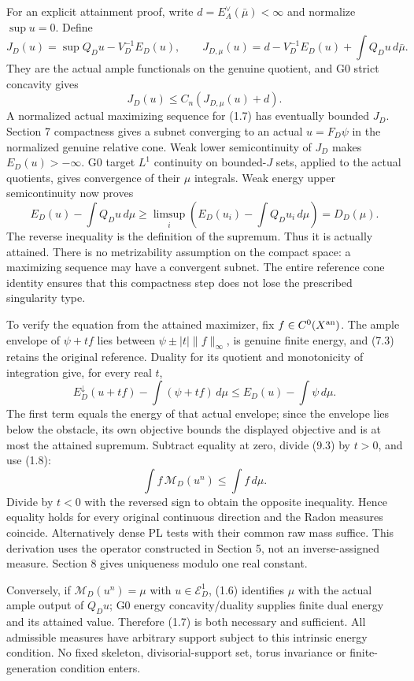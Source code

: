 \documentclass[
  10pt,
]{article}
\begin{document}
For an explicit attainment proof, write \(d=E_A^{\vee}(\bar\mu)<\infty\)
and normalize \(\sup u=0\). Define \[
 J_D(u)=\sup Q_Du-V_D^{-1}E_D(u),\qquad
 J_{D,\mu}(u)=d-V_D^{-1}E_D(u)+\int Q_Du\,d\bar\mu.
\] They are the actual ample functionals on the genuine quotient, and G0
strict concavity gives \[
                   J_D(u)\leq C_n(J_{D,\mu}(u)+d).            \tag{9.2}
\] A normalized actual maximizing sequence for (1.7) has eventually
bounded \(J_D\). Section 7 compactness gives a subnet converging to an
actual \(u=F_D\psi\) in the normalized genuine relative cone. Weak lower
semicontinuity of \(J_D\) makes \(E_D(u)>-\infty\). G0 target \(L^1\)
continuity on bounded-\(J\) sets, applied to the actual quotients, gives
convergence of their \(\mu\) integrals. Weak energy upper semicontinuity
now proves \[
 E_D(u)-\int Q_Du\,d\mu
       \geq\limsup_i\left(E_D(u_i)-\int Q_Du_i\,d\mu\right)=D_D(\mu).
\] The reverse inequality is the definition of the supremum. Thus it is
actually attained. There is no metrizability assumption on the compact
space: a maximizing sequence may have a convergent subnet. The entire
reference cone identity ensures that this compactness step does not lose
the prescribed singularity type.

To verify the equation from the attained maximizer, fix
\(f\in C^0(X^{\rm an})\). The ample envelope of \(\psi+tf\) lies between
\(\psi\pm|t|\|f\|_\infty\), is genuine finite energy, and (7.3) retains
the original reference. Duality for its quotient and monotonicity of
integration give, for every real \(t\), \[
 E_D^\downarrow(u+tf)-\int(\psi+tf)\,d\mu
                   \leq E_D(u)-\int\psi\,d\mu.              \tag{9.3}
\] The first term equals the energy of that actual envelope; since the
envelope lies below the obstacle, its own objective bounds the displayed
objective and is at most the attained supremum. Subtract equality at
zero, divide (9.3) by \(t>0\), and use (1.8):
\[\int f\,\mathcal M_D(u^n)\leq\int f\,d\mu.\] Divide by \(t<0\) with
the reversed sign to obtain the opposite inequality. Hence equality
holds for every original continuous direction and the Radon measures
coincide. Alternatively dense PL tests with their common raw mass
suffice. This derivation uses the operator constructed in Section 5, not
an inverse-assigned measure. Section 8 gives uniqueness modulo one real
constant.

Conversely, if \(\mathcal M_D(u^n)=\mu\) with \(u\in\mathcal E_D^1\),
(1.6) identifies \(\mu\) with the actual ample output of \(Q_Du\); G0
energy concavity/duality supplies finite dual energy and its attained
value. Therefore (1.7) is both necessary and sufficient. All admissible
measures have arbitrary support subject to this intrinsic energy
condition. No fixed skeleton, divisorial-support set, torus invariance
or finite-generation condition enters.
\end{document}
